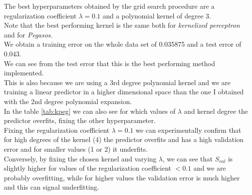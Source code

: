 % 
The best hyperparameters obtained by the grid search procedure are a regularization coefficient $\lambda = 0.1$ and a polynomial kernel of degree 3.\\
Note that the best performing kernel is the same both for \textit{kernelized perceptron} and for \textit{Pegasos}.\\ 
We obtain a training error on the whole data set of 0.035875 and a test error of 0.043.\\
We can see from the test error that this is the best performing method implemented.\\
This is also because we are using a 3rd degree polynomial kernel and we are training a linear predictor in a higher dimensional space than the one I obtained with the 2nd degree polynomial expansion.\\
In the table \ref{tab:kpeg} we can also see for which values of $\lambda$ and kernel degree the predictor overfits, fixing the other hyperparameter.\\
Fixing the regularization coefficient $\lambda = 0.1$ we can experimentally confirm that for high degrees of the kernel (4) the predictor overfits and has a high validation error and for smaller values (1 or 2) it underfits.\\
Conversely, by fixing the chosen kernel and varying $\lambda$, we can see that $S_{val}$ is slightly higher for values of the regularization coefficient $< 0.1$ and we are probably overfitting, while for higher values the validation error is much higher and this can signal underfitting.\\
